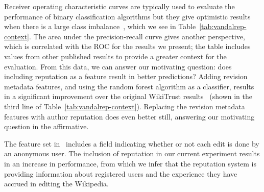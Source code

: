 Receiver operating characteristic curves are typically used to evaluate
the performance of binary classification algorithms but they give
optimistic results when there is a large class
imbalance~\cite{DavisGoadrich2006}, which we see in
Table~\ref{tab:vandalrep-context}.
The area under the precision-recall curve gives another perspective,
which is correlated with the ROC for the results we present; the table
includes values from other published results to provide a greater
context for the evaluation.
From this data, we can answer our motivating question: does including
reputation as a feature result in better predictions?
Adding revision metadata features, and using the random forest
algorithm as a classifier, results in a significant improvement over the
original WikiTrust results~\cite{Adler2010b} (shown in the third line of
Table~\ref{tab:vandalrep-context}).
Replacing the revision metadata features with author reputation does even better still,
answering our motivating question in the affirmative.


The feature set in~\cite{Adler2010b} includes a field indicating whether
or not each edit is done by an anonymous user.
The inclusion of reputation in our current experiment results in an
increase in performance, from which we infer that the reputation system
is providing information about registered users and the experience they
have accrued in editing the Wikipedia.
